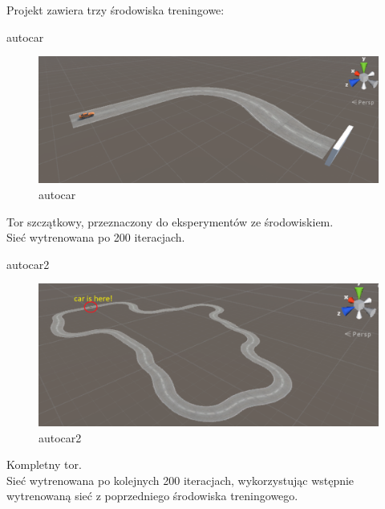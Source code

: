 Projekt zawiera trzy środowiska treningowe:
\begin{itemize*}
\item autocar \\
\begin{figure}[H]
\begin{center}
\includegraphics[width=16cm]{resources/figures/autocar.png}
\caption{autocar}
\end{center}
\end{figure}
\label{Autocar}
Tor szczątkowy, przeznaczony do eksperymentów ze środowiskiem. \\
Sieć wytrenowana po 200 iteracjach.

\newpage
\item autocar2 \\
\begin{figure}[H]
\begin{center}
\includegraphics[width=16cm]{resources/figures/autocar2.png}
\caption{autocar2}
\end{center}
\end{figure}
\label{Autocar2}
Kompletny tor. \\
Sieć wytrenowana po kolejnych 200 iteracjach, wykorzystując wstępnie wytrenowaną sieć z poprzedniego środowiska treningowego.


\end{itemize*}
